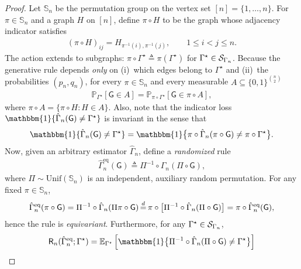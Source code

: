 \documentclass[12pt]{article}
\newcommand{\Ind}{\mathbbm{1}}
\newcommand{\E}{\mathbb{E}}
\newcommand {\pr} {\mathbb{P}}
\newcommand{\calS}{{\cal S}}
\newcommand{\pp}[1]{\left[#1\right]}
\newcommand{\s}[1]{\mathsf{#1}}
\begin{document}
\begin{proof}
Let $\mathbb{S}_n$ be the permutation group on the vertex set $[n]=\{1,\dots,n\}$.
For $\pi\in \mathbb{S}_n$ and a graph $H$ on $[n]$, define
$\pi\circ H$ to be the graph whose adjacency indicator satisfies
\begin{align}
(\pi \circ H)_{ij}=H_{\pi^{-1}(i),\pi^{-1}(j)},\qquad 1\leq i<j\leq n.
\end{align}
The action extends to subgraphs: $\pi \circ\Gamma^\star\triangleq\pi(\Gamma^\star)$
for $\Gamma^\star\in\calS_{\Gamma_n}$. Because the generative rule depends \emph{only} on (i)~which edges belong to $\Gamma^\star$ and (ii)~the probabilities $(p_n,q_n)$, for every $\pi\in \mathbb{S}_n$ and every measurable $A\subseteq\{0,1\}^{\binom n2}$ 
\begin{align}
\pr_{\Gamma^\star}\pp{\s G\in A}
=\pr_{\pi \circ\Gamma^\star}
        \pp{\s G\in\pi  \circ A},
\label{eq:invariance}
\end{align}
where $\pi  \circ A=\{\pi  \circ H:H\in A\}$. Also, note that the indicator loss
$\Ind\{\hat{\Gamma}_n(\s G)\neq\Gamma^\star\}$ is invariant in the sense that
\begin{align}
\Ind\{\hat{\Gamma}_n(\s G)\neq\Gamma^\star\}
=\Ind\bigl\{\pi  \circ \hat{\Gamma}_n(\pi  \circ \s G)
          \neq\pi  \circ \Gamma^\star\bigr\}.
\label{eq:loss-invariance}
\end{align}
Now, given an arbitrary estimator $\hat{\Gamma}_n$, define a \emph{randomized} rule
\begin{align}
\hat{\Gamma}_n^{\mathrm{eq}}(\s G)
   \triangleq\Pi^{-1}  \circ 
     \hat{\Gamma}_n(\Pi  \circ \s G),
\end{align}
where
$\Pi\sim\mathrm{Unif}(\mathbb{S}_n)$ is an independent, auxiliary random permutation.
For any fixed $\pi\in \mathbb{S}_n$,
\begin{align}
\hat{\Gamma}_n^{\mathrm{eq}}(\pi  \circ \s G)
   =\Pi^{-1}  \circ \hat{\Gamma}_n(\Pi\pi  \circ \s G)
   \,{\buildrel d\over=}\,
   \pi  \circ \bigl[\Pi^{-1}  \circ \hat{\Gamma}_n(\Pi  \circ \s G)\bigr]
   =\pi  \circ \hat{\Gamma}_n^{\mathrm{eq}}(\s G),
\end{align}
hence the rule is \emph{equivariant}. Furthermore, for any $\Gamma^\star\in\calS_{\Gamma_n}$,
\begin{align}
\s{R}_n(\hat{\Gamma}_n^{\mathrm{eq}};\Gamma^\star)
&=\E_{\Gamma^\star}
   \pp{\Ind\bigl\{\Pi^{-1}  \circ \hat{\Gamma}_n(\Pi  \circ \s G)
               \neq\Gamma^\star\bigr\}}\\

\end{align}
\end{proof}
\end{document}
